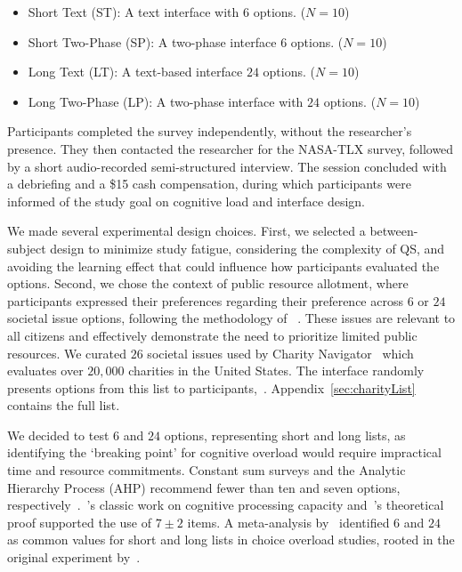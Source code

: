 \begin{itemize}
    \item Short Text (ST): A text interface with $6$ options. ($N=10$)
    \item Short Two-Phase (SP): A two-phase interface $6$ options. ($N=10$)
    \item Long Text (LT): A text-based interface $24$ options. ($N=10$)
    \item Long Two-Phase (LP): A two-phase interface with $24$ options. ($N=10$)
\end{itemize}

Participants completed the survey independently, without the researcher's presence. They then contacted the researcher for the NASA-TLX survey, followed by a short audio-recorded semi-structured interview. The session concluded with a debriefing and a \$15 cash compensation, during which participants were informed of the study goal on cognitive load and interface design.

We made several experimental design choices. First, we selected a between-subject design to minimize study fatigue, considering the complexity of QS, and avoiding the learning effect that could influence how participants evaluated the options. Second, we chose the context of public resource allotment, where participants expressed their preferences regarding their preference across $6$ or $24$ societal issue options, following the methodology of ~\textcite{chengCanShowWhat2021}. These issues are relevant to all citizens and effectively demonstrate the need to prioritize limited public resources. We curated $26$ societal issues used by Charity Navigator~\cite{CharityNavigator2023} which evaluates over $20,000$ charities in the United States. The interface randomly presents options from this list to participants,~. Appendix~\ref{sec:charityList} contains the full list.

We decided to test $6$ and $24$ options, representing short and long lists, as identifying the `breaking point' for cognitive overload would require impractical time and resource commitments. Constant sum surveys and the Analytic Hierarchy Process (AHP) recommend fewer than ten and seven options, respectively~\cite{moroneyQuestionnaireDesignHow2019, saatyGroupDecisionMaking2013, saatyPrinciplesAnalyticHierarchy1987}.~\textcite{millerMagicalNumberSeven1956}'s classic work on cognitive processing capacity and~\textcite{saaty2003magic}'s theoretical proof supported the use of $7\pm2$ items. A meta-analysis by~\textcite{chernevChoiceOverloadConceptual2015} identified $6$ and $24$ as common values for short and long lists in choice overload studies, rooted in the original experiment by~\textcite{iyengarWhenChoiceDemotivating2000}.

